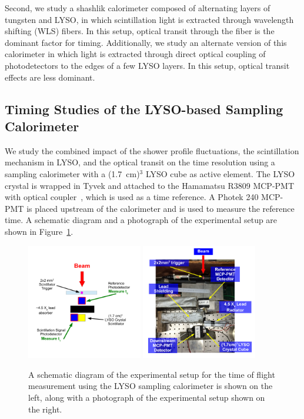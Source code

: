 \documentclass[12pt]{article}
\begin{document}
Second, we study a shashlik calorimeter composed of alternating layers of
tungsten and LYSO, in which scintillation light is extracted through wavelength
shifting (WLS) fibers. In this setup, optical transit through the fiber is the
dominant factor for timing. Additionally, we study an alternate version of this
calorimeter in which light is extracted through direct optical coupling of
photodetectors to the edges of a few LYSO layers. In this setup, optical transit
effects are less dominant.



\subsection{Timing Studies of the LYSO-based Sampling Calorimeter}

We study the combined impact of the shower profile fluctuations, the
scintillation mechanism in LYSO, and the optical transit on the time resolution
using a sampling calorimeter with a (1.7~cm)$^{3}$ LYSO cube as active
element. The LYSO crystal is wrapped in Tyvek and attached to the Hamamatsu
R3809 MCP-PMT with optical coupler~\cite{grease}, which is used as a time reference. A Photek 240
MCP-PMT is placed upstream of the calorimeter and is used to measure the
reference time. A schematic diagram and a photograph of the experimental setup
are shown in Figure~\ref{fig:LYSOSamplingCaloSetup}. 

\begin{figure}[h] \centering
\includegraphics[width=0.45\textwidth]{figs/LYSOSamplingCaloSetupSchematic} 
\includegraphics[width=0.45\textwidth]{figs/LYSOSamplingCaloSetupPhoto} 
\caption{ A schematic diagram of the experimental setup for the
time of flight measurement using the LYSO sampling calorimeter is shown
on the left, along with a photograph of the experimental setup shown on the right. } 
\label{fig:LYSOSamplingCaloSetup}
\end{figure}
\end{document}
